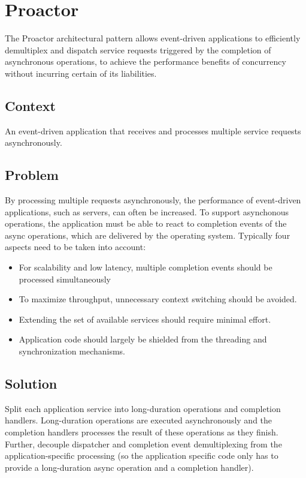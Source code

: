 \section{Proactor}
\label{sec:proactor}

The Proactor architectural pattern allows event-driven applications to efficiently demultiplex and dispatch service requests triggered by the completion of asynchronous operations, to achieve the performance benefits of concurrency without incurring certain of its liabilities.


\subsection*{Context}

An event-driven application that receives and processes multiple service requests asynchronously.


\subsection*{Problem}

By processing multiple requests asynchronously, the performance of event-driven applications, such as servers, can often be increased. To support asynchonous operations, the application must be able to react to completion events of the async operations, which are delivered by the operating system. Typically four aspects need to be taken into account:

\begin{itemize}
	\item For scalability and low latency, multiple completion events should be processed simultaneously
	\item To maximize throughput, unnecessary context switching should be avoided.
	\item Extending the set of available services should require minimal effort.
	\item Application code should largely be shielded from the threading and synchronization mechanisms.
\end{itemize}


\subsection*{Solution}

Split each application service into long-duration operations and completion handlers. Long-duration operations are executed asynchronously and the completion handlers processes the result of these operations as they finish. Further, decouple dispatcher and completion event demultiplexing from the application-specific processing (so the application specific code only has to provide a long-duration async operation and a completion handler).


